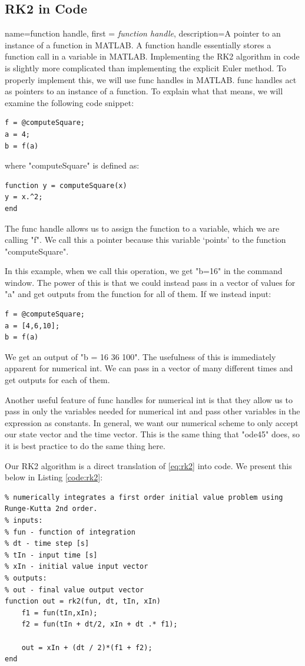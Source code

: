 \documentclass[12pt]{report}
\begin{document}
\subsection{RK2 in Code}
{
    name=function handle,
    first = {\textit{function handle}},
    description={A pointer to an instance of a function in MATLAB. A function handle essentially stores a function call in a variable in MATLAB.}
}
Implementing the RK2 algorithm in code is slightly more complicated than implementing the explicit Euler method. To properly implement this, we will use \glspl{func handle} in MATLAB. \Glspl{func handle} act as pointers to an instance of a function. To explain what that means, we will examine the following code snippet:
\begin{lstlisting}[style=Matlab-editor]
f = @computeSquare;
a = 4;
b = f(a)
\end{lstlisting}
where "computeSquare" is defined as:
\lstset{style=mystyle}
\begin{lstlisting}[style=Matlab-editor]
function y = computeSquare(x)
y = x.^2;
end
\end{lstlisting}
The \gls{func handle} allows us to assign the function to a variable, which we are calling "f". We call this a pointer because this variable ‘points’ to the function "computeSquare".

In this example, when we call this operation, we get "b=16" in the command window. The power of this is that we could instead pass in a vector of values for "a" and get outputs from the function for all of them. If we instead input:
\begin{lstlisting}[style=Matlab-editor]
f = @computeSquare;
a = [4,6,10];
b = f(a)
\end{lstlisting}
We get an output of "b = 16  36  100". The usefulness of this is immediately apparent for \gls{numerical int}. We can pass in a vector of many different times and get outputs for each of them. 

Another useful feature of \glspl{func handle} for \gls{numerical int} is that they allow us to pass in only the variables needed for \gls{numerical int} and pass other variables in the expression as constants. In general, we want our numerical scheme to only accept our \gls{state vector} and the time vector. This is the same thing that "ode45" does, so it is best practice to do the same thing here.

Our RK2 algorithm is a direct translation of \eqref{eq:rk2} into code. We present this below in Listing \ref{code:rk2}:
\begin{lstlisting}[style=Matlab-editor, caption=RK2 Integrator]
%% RK2 Integrator
% numerically integrates a first order initial value problem using Runge-Kutta 2nd order.
% inputs:
% fun - function of integration
% dt - time step [s]
% tIn - input time [s]
% xIn - initial value input vector
% outputs:
% out - final value output vector
function out = rk2(fun, dt, tIn, xIn)
    f1 = fun(tIn,xIn);
    f2 = fun(tIn + dt/2, xIn + dt .* f1);
    
    out = xIn + (dt / 2)*(f1 + f2);
end
\end{lstlisting}\label{code:rk2}
\end{document}
